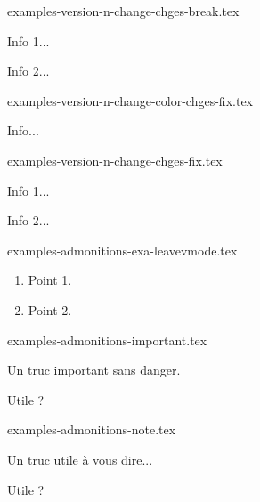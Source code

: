 \begin{filecontents*}[overwrite]{examples-version-n-change-chges-break.tex}
\begin{tdocbreak}
    \item Info 1...
    \item Info 2...
\end{tdocbreak}
\end{filecontents*}


\begin{filecontents*}[overwrite]{examples-version-n-change-color-chges-fix.tex}
\begin{tdocfix}[col = CadetBlue]
    \item Info...
\end{tdocfix}
\end{filecontents*}


\begin{filecontents*}[overwrite]{examples-version-n-change-chges-fix.tex}
\begin{tdocfix}
    \item Info 1...
    \item Info 2...
\end{tdocfix}
\end{filecontents*}


\begin{filecontents*}[overwrite]{examples-admonitions-exa-leavevmode.tex}
\begin{tdocexa}
    \leavevmode
    \begin{enumerate}
        \item Point 1.

        \item Point 2.
    \end{enumerate}
\end{tdocexa}
\end{filecontents*}


\begin{filecontents*}[overwrite]{examples-admonitions-important.tex}
\begin{tdocimp}
    Un truc important sans danger.
\end{tdocimp}

\begin{tdocimp}
    Utile ?
\end{tdocimp}
\end{filecontents*}


\begin{filecontents*}[overwrite]{examples-admonitions-note.tex}
\begin{tdocnote}
    Un truc utile à vous dire...
\end{tdocnote}

\begin{tdocnote}
    Utile ?
\end{tdocnote}
\end{filecontents*}


